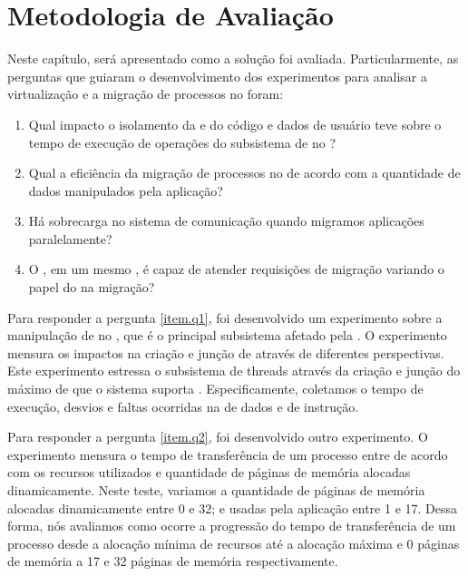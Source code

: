 \glsresetall
\chapter{Metodologia de Avaliação}
\label{chap.experiment-methodology}
Neste capítulo, será apresentado como a solução foi avaliada. Particularmente, as perguntas que guiaram o desenvolvimento dos experimentos para analisar a virtualização e a migração de processos no \nanvix foram:

\begin{enumerate}[start=1,label={Q\arabic*}]
    \item \label{item.q1}Qual impacto o isolamento da \uarea e do código e dados de usuário teve sobre o tempo de execução de operações do subsistema de \threads no \nanvix?
    \item \label{item.q2}Qual a eficiência da migração de processos no \nanvix de acordo com a quantidade de dados manipulados pela aplicação?
    \item \label{item.q3}Há sobrecarga no sistema de comunicação quando migramos aplicações paralelamente?
    \item \label{item.q4}O \daemon, em um mesmo \cluster, é capaz de atender requisições de migração variando o papel do \cluster na migração?
\end{enumerate}

Para responder a pergunta \ref{item.q1}, foi desenvolvido um experimento sobre a manipulação de \threads no \nanvix, que é o principal subsistema afetado pela \uarea. O experimento mensura os impactos na criação e junção de \threads através de diferentes perspectivas. Este experimento estressa o subsistema de threads através da criação e junção do máximo de \threads que o sistema suporta  \threads. Especificamente, coletamos o tempo de execução, desvios e faltas ocorridas na \cache de dados e de instrução.

Para responder a pergunta \ref{item.q2}, foi desenvolvido outro experimento. O experimento mensura o tempo de transferência de um processo entre \clusters de acordo com os recursos utilizados \ie \threads e quantidade de páginas de memória alocadas dinamicamente. Neste teste, variamos a quantidade de páginas de memória alocadas dinamicamente entre 0 e 32; e \threads usadas pela aplicação entre 1 e 17. Dessa forma, nós avaliamos como ocorre a progressão do tempo de transferência de um processo desde a alocação mínima de recursos até a alocação máxima  \thread e 0 páginas de memória a 17 \threads e 32 páginas de memória respectivamente.

